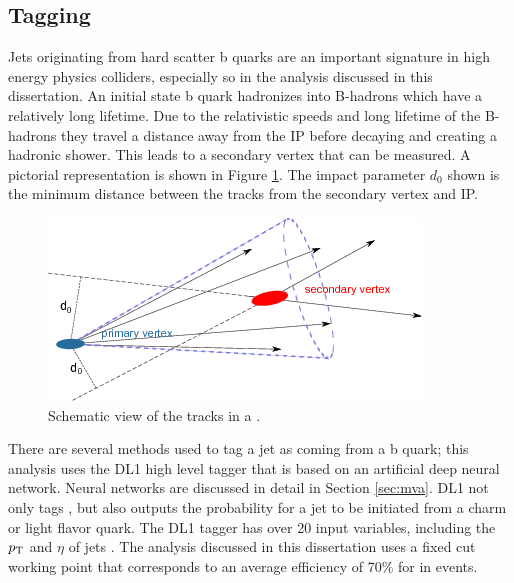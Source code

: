 
		\subsection{\bjet Tagging}\label{ssec:flavor-tagging}
			Jets originating from hard scatter b quarks are an important signature in high energy physics colliders, especially so in the analysis discussed in this dissertation. An initial state b quark hadronizes into B-hadrons which have a relatively long lifetime. Due to the relativistic speeds and long lifetime of the B-hadrons they travel a distance away from the \gls{IP} before decaying and creating a hadronic shower. This leads to a secondary vertex that can be measured. A pictorial representation is shown in Figure \ref{fig:bjet}. The impact parameter $d_0$ shown is the minimum distance between the tracks from the secondary vertex and \gls{IP}. 

			\begin{figure}[!ht]
			\centering
			\includegraphics[width=.5\textwidth,keepaspectratio=true]{chapters/chapter5_eventreconnstruction/images/b-jet-schetch.png}
			\caption{\label{fig:bjet} Schematic view of the tracks in a \bjet \cite{bjet-trigger}.}
			\end{figure}

			There are several methods used to tag a jet as coming from a b quark; this analysis uses the DL1 high level tagger \cite{b-tagging} that is based on an artificial deep neural network. Neural networks are discussed in detail in Section \ref{sec:mva}. DL1 not only tags \bjets, but also outputs the probability for a jet to be initiated from a charm or light flavor quark. The DL1 tagger has over 20 input variables, including the $p_{\text{T}}$ and $\eta$ of jets  \cite{b-tagging-input-variables}. The analysis discussed in this dissertation uses a fixed cut working point that corresponds to an average efficiency of 70\% for \bjets in \ttbar events. 



